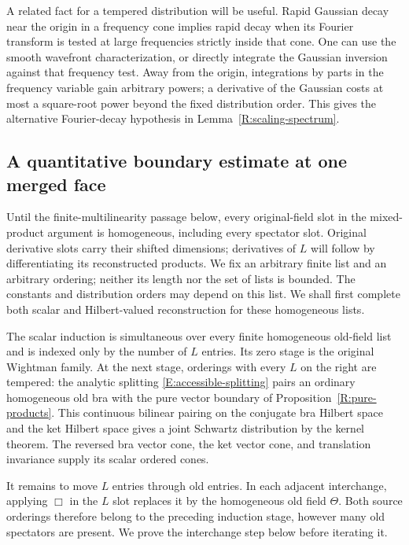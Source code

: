A related fact for a tempered distribution will be useful.  Rapid
Gaussian decay near the origin in a frequency cone implies rapid
decay when its Fourier transform is tested at large frequencies
strictly inside that cone.  One can use the smooth wavefront
characterization, or directly integrate the Gaussian inversion
against that frequency test.  Away from the origin, integrations by
parts in the frequency variable gain arbitrary powers; a derivative
of the Gaussian costs at most a square-root power beyond the fixed
distribution order.  This gives the alternative Fourier-decay
hypothesis in Lemma~\ref{R:scaling-spectrum}.

\subsection{A quantitative boundary estimate at one merged face}

Until the finite-multilinearity passage below, every original-field
slot in the mixed-product argument is homogeneous, including every
spectator slot.  Original derivative slots carry their shifted
dimensions; derivatives of $L$ will follow by differentiating its
reconstructed products.
We fix an arbitrary finite list and an arbitrary ordering; neither its
length nor the set of lists is bounded.  The constants and distribution
orders may depend on this list.  We shall first complete both scalar
and Hilbert-valued reconstruction for these homogeneous lists.

The scalar induction is simultaneous over every finite homogeneous
old-field list and is indexed only by the number of $L$ entries.
Its zero stage is the original Wightman family.  At the next stage,
orderings with every $L$ on the right are tempered: the analytic
splitting \eqref{E:accessible-splitting} pairs an ordinary
homogeneous old bra with the pure vector boundary of
Proposition~\ref{R:pure-products}.  This continuous bilinear pairing
on the conjugate bra Hilbert space and the ket Hilbert space gives a
joint Schwartz distribution by the kernel theorem.  The reversed
bra vector cone, the ket vector cone, and translation invariance
supply its scalar ordered cones.

It remains to move $L$ entries through old entries.  In each adjacent
interchange, applying $\Box$ in the $L$ slot replaces it by the
homogeneous old field $\Theta$.  Both source orderings therefore
belong to the preceding induction stage, however many old spectators
are present.  We prove the interchange step below before iterating it.

